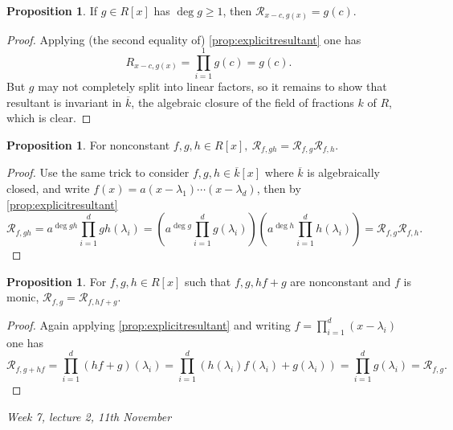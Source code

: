 \documentclass{article}
\newcommand{\re}{\mathcal{R}}
\theoremstyle{definition}
\newtheorem{prop}[defn]{Proposition}
\begin{document}
\begin{prop}
\label{prop:resoflinearwithgeneral}
If $g\in R[x]$ has $\deg g\geq 1$, then $\re_{x-c,g(x)}=g(c)$.
\end{prop}
\begin{proof}
Applying (the second equality of) \ref{prop:explicitresultant} one has
\[
R_{x-c,g(x)}=\prod_{i=1}^1g(c)=g(c).
\]
But $g$ may not completely split into linear factors, so it remains to show that resultant is invariant in $\overline k$, the algebraic closure of the field of fractions $k$ of $R$, which is clear.
\end{proof}

\begin{prop}
\label{prop:ResfghisResfgplusResfh}
For nonconstant $f,g,h\in R[x],\ \re_{f,gh}=\re_{f,g}\re_{f,h}$.
\end{prop}
\begin{proof}
Use the same trick to consider $f,g,h\in\overline k[x]$ where $\overline k$ is algebraically closed, and write $f(x)=a(x-\lambda_1)\cdots (x-\lambda_d)$, then by \ref{prop:explicitresultant}
\[
\re_{f,gh}=a^{\deg gh}\prod_{i=1}^d gh(\lambda_i)=\left(a^{\deg g}\prod_{i=1}^d g(\lambda_i)\right)\left(a^{\deg h}\prod_{i=1}^d h(\lambda_i)\right)=\re_{f,g}\re_{f,h}.
\]
\end{proof}

\begin{prop}
\label{prop:ResfgisResfhgplusg}
For $f,g,h\in R[x]$ such that $f,g,hf+g$ are nonconstant and $f$ is monic, $\re_{f,g}=\re_{f,hf+g}$.
\end{prop}
\begin{proof}
Again applying \ref{prop:explicitresultant} and writing $f=\prod_{i=1}^d(x-\lambda_i)$ one has
\[
\re_{f,g+hf}=\prod_{i=1}^d (hf+g)(\lambda_i)=\prod_{i=1}^d (h(\lambda_i)f(\lambda_i)+g(\lambda_i))=\prod_{i=1}^d g(\lambda_i)=\re_{f,g}.
\]
\end{proof}

\begin{flushright}
\textit{Week 7, lecture 2, 11th November}
\end{flushright}
\end{document}
